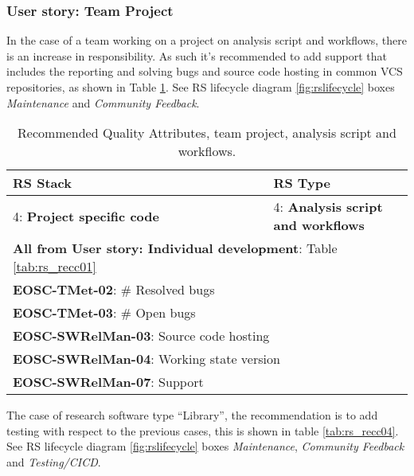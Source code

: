 \subsubsection{User story: Team Project}

In the case of a team working on a project on analysis script and workflows, there is an increase in responsibility. As such it's recommended to add support that includes the reporting and solving bugs and source code hosting in common VCS repositories, as shown in Table \ref{tab:rs_recc03}. See RS lifecycle diagram \ref{fig:rslifecycle} boxes \textit{Maintenance} and \textit{Community Feedback}.

\begin{center}
\begin{table}[h]
  \small
  \begin{tabular}{|p{0.65\linewidth}|p{0.35\linewidth}|} \hline

    \textbf{RS Stack} & \textbf{RS Type} \\ \hline \hline
    4: \textbf{Project specific code} &
    4: \textbf{Analysis script and workflows} \\ \hline \hline
    \multicolumn{2}{|l|}{\textbf{All from User story: Individual development}: Table \ref{tab:rs_recc01}} \\ \hline
    \multicolumn{2}{|l|}{\textbf{EOSC-TMet-02}: \# Resolved bugs} \\ \hline
    \multicolumn{2}{|l|}{\textbf{EOSC-TMet-03}: \# Open bugs} \\ \hline
    \multicolumn{2}{|l|}{\textbf{EOSC-SWRelMan-03}: Source code hosting} \\ \hline
    \multicolumn{2}{|l|}{\textbf{EOSC-SWRelMan-04}: Working state version} \\ \hline
    \multicolumn{2}{|l|}{\textbf{EOSC-SWRelMan-07}: Support} \\ \hline

  \end{tabular}
  \caption{Recommended Quality Attributes, team project, analysis script and workflows.}
  \label{tab:rs_recc03}
\end{table}
\end{center}

The case of research software type ``Library'', the recommendation is to add testing with respect to the previous cases, this is shown in table \ref{tab:rs_recc04}.
See RS lifecycle diagram \ref{fig:rslifecycle} boxes \textit{Maintenance}, \textit{Community Feedback} and \textit{Testing/CICD}.

